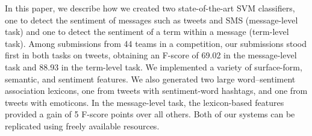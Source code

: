 In this paper, we describe how we created two state-of-the-art SVM classifiers, one to detect the sentiment of messages such as tweets and SMS (message-level
 task) and one to detect the sentiment of a term within a message (term-level
 task). Among submissions from 44 teams in a competition, our submissions
 stood first in both tasks on tweets, obtaining an F-score of 69.02 in the
 message-level task and 88.93 in the term-level task. We implemented a variety
 of surface-form, semantic, and sentiment features. We also generated two large
 word--sentiment association lexicons, one from tweets with sentiment-word
 hashtags, and one from tweets with emoticons. In the message-level task, the
 lexicon-based  features provided a gain of 5 F-score points over all others. 
 Both of our systems can be replicated using freely
 available resources.

